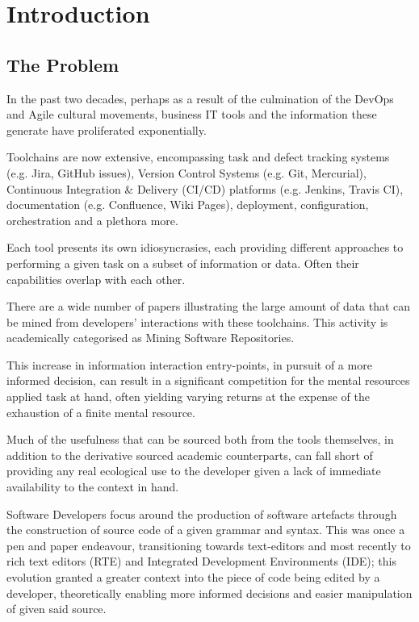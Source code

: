 \chapter{Introduction}

\section{The Problem}

In the past two decades, perhaps as a result of the culmination of the DevOps and Agile cultural movements, business IT tools and the information these generate have proliferated exponentially.  %

Toolchains are now extensive, encompassing task and defect tracking systems (e.g. Jira, GitHub issues), Version Control Systems (e.g. Git, Mercurial), Continuous Integration \& Delivery (CI/CD) platforms (e.g. Jenkins, Travis CI), documentation (e.g. Confluence, Wiki Pages), deployment, configuration, orchestration and a plethora more.


Each tool presents its own idiosyncrasies, each providing different approaches to performing a given task on a subset of information or data. Often their capabilities overlap with each other.

There are a wide number of papers illustrating the large amount of data that can be mined from developers' interactions with these toolchains. This activity is academically categorised as Mining Software Repositories.


This increase in information interaction entry-points, in pursuit of a more informed decision, can result in a significant competition for the mental resources applied task at hand, often yielding varying returns at the expense of the exhaustion of a finite mental resource.

Much of the usefulness that can be sourced both from the tools themselves, in addition to the derivative sourced academic counterparts, can fall short of providing any real ecological use to the developer given a lack of immediate availability to the context in hand.

Software Developers focus around the production of software artefacts through the construction of source code of a given grammar and syntax. This was once a pen and paper endeavour, transitioning towards text-editors and most recently to rich text editors (RTE) and Integrated Development Environments (IDE); this evolution granted a greater context into the piece of code being edited by a developer, theoretically enabling more informed decisions and easier manipulation of given said source.

